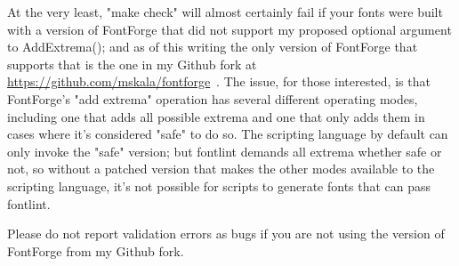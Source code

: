 \documentclass{article}
\begin{document}
At the very least, "make check" will almost certainly fail if your fonts
were built with a version of FontForge that did not support my proposed
optional argument to AddExtrema(); and as of this writing the only version
of FontForge that supports that is the one in my Github fork at
\url{https://github.com/mskala/fontforge}~.  The issue, for those
interested, is that FontForge's "add extrema" operation has several
different operating modes, including one that adds all possible extrema and
one that only adds them in cases where it's considered "safe" to do so.  The
scripting language by default can only invoke the "safe" version; but
fontlint demands all extrema whether safe or not, so without a patched
version that makes the other modes available to the scripting language, it's
not possible for scripts to generate fonts that can pass fontlint.

Please do not report validation errors as bugs if you are not using the
version of FontForge from my Github fork.
\end{document}
